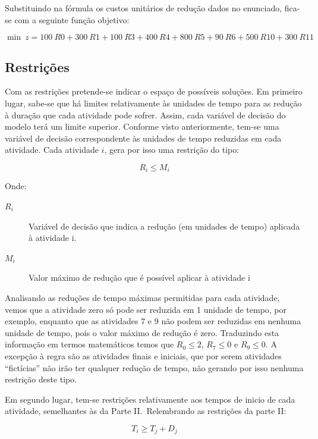 Substituindo na fórmula os custos unitários de redução dados no enunciado, fica-se com a seguinte função objetivo:

\begin{displaymath} 
	\min~z = 100~R0 + 300~R1 + 100~R3 + 400~R4 + 800~R5 + 90~R6
	+ 500~R10 + 300~R11 
\end{displaymath}


\subsection{Restrições}

Com as restrições pretende-se indicar o espaço de possíveis soluções. Em primeiro lugar, sabe-se que há limites relativamente às unidades de tempo para as redução à duração que cada atividade pode sofrer. Assim, cada variável de decisão do modelo terá um limite superior. Conforme visto anteriormente, tem-se uma variável de decisão correspondente às unidades de tempo reduzidas em cada atividade. Cada atividade $i$, gera por isso uma restrição do tipo:

\begin{displaymath}
	 R_{i} \leq M_{i}
\end{displaymath}

Onde:
\begin{description}
	\item[$R_{i}$] Variável de decisão que indica a redução (em unidades de tempo)
		aplicada à atividade i.
	\item[$M_{i}$]Valor máximo de redução que é possível aplicar à atividade i
\end{description}

Analisando as reduções de tempo máximas permitidas para cada atividade, vemos que a atividade zero só pode
ser reduzida em 1 unidade de tempo, por exemplo, enquanto que as atividades
7 e 9 não podem ser reduzidas em nenhuma unidade de tempo, pois o valor máximo
de redução é zero. Traduzindo esta informação em termos matemáticos temos que
$R_{0} \leq 2$,  $R_{7} \leq 0$ e $R_{9} \leq 0$. A excepção à regra são as atividades finais e iniciais, que por serem atividades ``fictícias'' não irão ter qualquer redução de tempo, não gerando por isso nenhuma restrição deste tipo.

Em segundo lugar, tem-se restrições relativamente aos tempos de inicio de cada atividade,
semelhantes às da Parte II.\ Relembrando as restrições da parte
II:

\begin{displaymath} T_{i} \geq T_{j} + D_{j} \end{displaymath}

